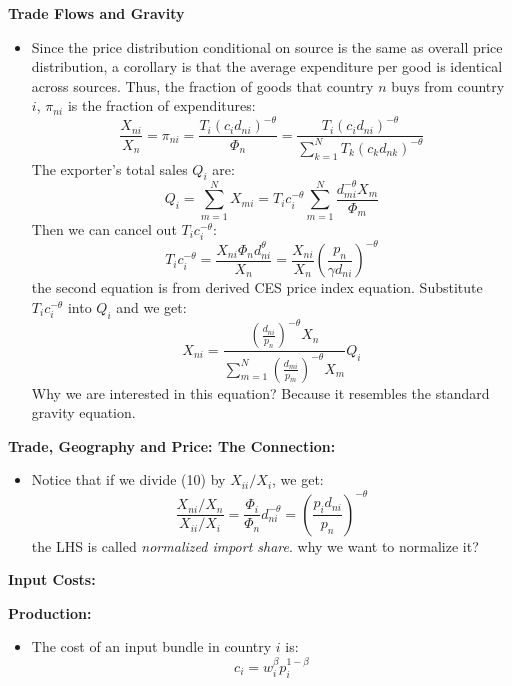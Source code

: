 \documentclass{book}
\theoremstyle{plain}
\theoremstyle{definition}
\newcommand{\red}[1]{{\color{red} #1}}
\newcommand{\blue}[1]{{\color{blue} #1}}
\newcommand{\mytitle}[1]{{\large{\textbf{#1}}}}
\newcommand{\mysubtitle}[1]{{\normalsize{\textbf{#1}}}}
\begin{document}
\mysubtitle{Trade Flows and Gravity}
\begin{itemize}
	\item Since the price distribution conditional on source is the same as overall price distribution, a corollary is that the average expenditure per good is identical across sources. Thus, the fraction of goods that country $n$ buys from country $i$, $\pi_{ni}$ is the fraction of expenditures:
	\[\frac { X _ { n i } } { X _ { n } } = \pi_{ni} = \frac { T _ { i } \left( c _ { i } d _ { n i } \right) ^ { - \theta } } { \Phi _ { n } } = \frac { T _ { i } \left( c _ { i } d _ { n i } \right) ^ { - \theta } } { \sum _ { k = 1 } ^ { N } T _ { k } \left( c _ { k } d _ { n k } \right) ^ { - \theta } } \tag{10}\]
	The exporter's total sales $Q_i$ are:
	\[Q _ { i } = \sum _ { m = 1 } ^ { N } X _ { m i } = T _ { i } c _ { i } ^ { - \theta } \sum _ { m = 1 } ^ { N } \frac { d _ { m i } ^ { - \theta } X _ { m } } { \Phi _ { m } }\]
	Then we can cancel out $T_i c_i^{-\theta}$:
	\[T_i c_i^{-\theta} = 
	\frac{X_{ni}\Phi_n d_{ni}^\theta}{X_n} = 
	\frac{X_{ni}}{X_n} \left(\frac{p_n}{\gamma d_{ni}}\right)^{-\theta}\]
	the second equation is from derived CES price index equation. Substitute $T_i c_i^{-\theta}$ into $Q_i$ and we get:
	\[X _ { n i } = \frac { \left( \frac { d _ { n i } } { p _ { n } } \right) ^ { - \theta } X _ { n } } { \sum _ { m = 1 } ^ { N } \left( \frac { d _ { m i } } { p _ { m } } \right) ^ { - \theta } X _ { m } } Q _ { i } \tag{11}\]
	\blue{Why we are interested in this equation?} Because it resembles the standard gravity equation.

\end{itemize}


\mytitle{Trade, Geography and Price: The Connection:}
\begin{itemize}
	\item Notice that if we divide (10) by $X_{ii}/X_i$, we get:
	\[\frac { X _ { n i } / X _ { n } } { X _ { i i } / X _ { i } } = \frac { \Phi _ { i } } { \Phi _ { n } } d _ { n i } ^ { - \theta } = \left( \frac { p _ { i } d _ { n i } } { p _ { n } } \right) ^ { - \theta }\]
	the LHS is called \textit{normalized import share}. \red{why we want to normalize it?}
\end{itemize}


\mytitle{Input Costs:}

\mysubtitle{Production:}
\begin{itemize}
	\item The cost of an input bundle in country $i$ is:
	\[c _ { i } = w _ { i } ^ { \beta } p _ { i } ^ { 1 - \beta }\]
\end{itemize}
\end{document}
